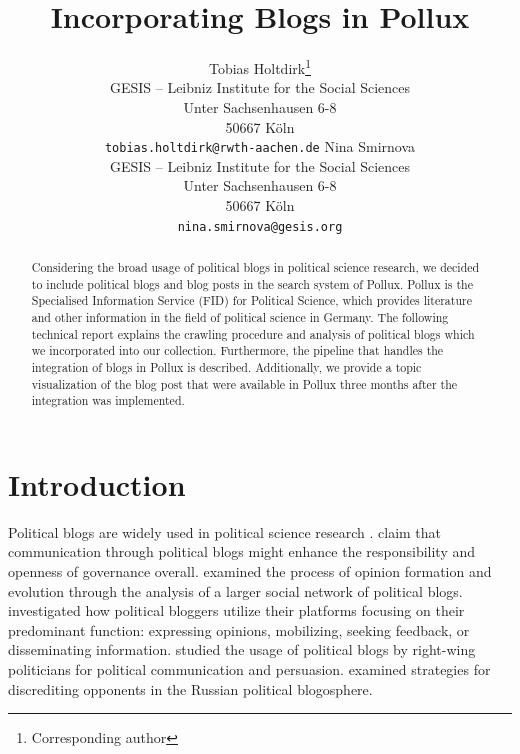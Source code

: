 \documentclass{article}
\title{Incorporating Blogs in Pollux}
\author{Tobias Holtdirk\thanks{Corresponding author}\\
	GESIS -- Leibniz Institute for the Social Sciences\\
	Unter Sachsenhausen 6-8 \\
    50667 Köln \\
	\texttt{tobias.holtdirk@rwth-aachen.de}
    \And 
    Nina Smirnova\\
	GESIS -- Leibniz Institute for the Social Sciences\\
	Unter Sachsenhausen 6-8 \\
    50667 Köln \\
	\texttt{nina.smirnova@gesis.org}
}
\begin{document}
\maketitle

\begin{abstract}
    Considering the broad usage of political blogs in political science research, we decided to include political blogs and blog posts in the search system of Pollux. Pollux is the Specialised Information Service (FID) for Political Science, which provides literature and other information in the field of political science in Germany. The following technical report explains the crawling procedure and analysis of political blogs which we incorporated into our collection. Furthermore, the pipeline that handles the integration of blogs in Pollux is described. Additionally, we provide a topic visualization of the blog post that were available in Pollux three months after  the integration was implemented. 
\end{abstract}



\section{Introduction}
Political blogs are widely used in political science research \citep{wallsten_agenda_2007, coleman_political_2008, wallsten_political_2008, guner_political_2009, akinnubi_deliberative_2023, peng_role_2023}. \citet{coleman_political_2008} claim that communication through political blogs might enhance the responsibility and openness of governance overall. \citet{peng_role_2023} examined the process of opinion formation and evolution through the analysis of a larger social network of political blogs. \citet{wallsten_political_2008} investigated how political bloggers utilize their platforms focusing on their predominant function: expressing opinions, mobilizing, seeking feedback, or disseminating information. \citet{demasi_analysing_2020} studied the usage of political blogs by right-wing politicians for political communication and persuasion. \citet{balakhonskaya_communicative_2020} examined strategies for discrediting opponents in the Russian political blogosphere.
\end{document}
